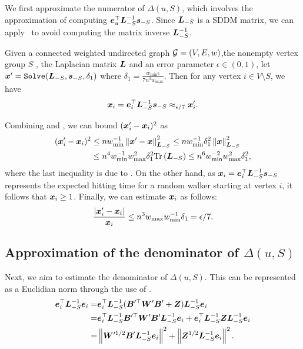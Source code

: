 \documentclass[10pt,journal,compsoc,twocolumn,twoside]{IEEEtran}
\begin{document}
We first approximate the numerator of \(\Delta(u,S)\), which involves the approximation of computing \(\boldsymbol{e}_u^\top\boldsymbol{L}_{-S}^{-1}\boldsymbol{s}_{-S}\).
Since \(\boldsymbol{L}_{-S}\) is a SDDM matrix, we can apply~ to avoid computing the matrix inverse \(\boldsymbol{L}_{-S}^{-1}\).
\begin{lemma}\label{lem:approx-numer}
    Given a connected weighted undirected graph \(\mathcal{G}=(V,E,w)\),the nonempty vertex group \(S\) , the Laplacian matrix \(\boldsymbol{L}\) and an error parameter \(\epsilon\in(0,1)\), let \(\boldsymbol{x}'=\mathtt{Solve}(\boldsymbol{L}_{-S},\boldsymbol{s}_{-S},\delta_1)\) where \(\delta_1=\frac{w_{\min}\epsilon}{7n^3w_{\max}}\). Then for any vertex \(i\in V\setminus S\), we have
    \begin{equation}\label{eq:approx-numer}
        \boldsymbol{x}_i=\boldsymbol{e}_i^\top\boldsymbol{L}_{-S}^{-1}\boldsymbol{s}_{-S}\approx_{\epsilon/7}\boldsymbol{x}'_i.
    \end{equation}
\end{lemma}
\begin{IEEEproof}

    Combining  and , we can bound \((\boldsymbol{x}'_i-\boldsymbol{x}_i)^2\) as
    \begin{align*}
        (\boldsymbol{x}'_i-\boldsymbol{x}_i)^2
         & \le nw_{\min}^{-1}\left\Vert\boldsymbol{x}'-\boldsymbol{x}\right\Vert^2_{\boldsymbol{L}_{-S}}
        \le nw_{\min}^{-1}\delta_1^2\left\Vert\boldsymbol{x}\right\Vert^2_{\boldsymbol{L}_{-S}}        \\
         & \le n^4w_{\min}^{-1}w_{\max}^2\delta_1^2\mathrm{Tr}\left(\boldsymbol{L}_{-S}\right)
        \le n^6w_{\min}^{-2}w_{\max}^2\delta_1^2,
    \end{align*}
    where the last inequality is due to .
    On the other hand, as \(\boldsymbol{x}_i=\boldsymbol{e}_i^\top\boldsymbol{L}_{-S}^{-1}\boldsymbol{s}_{-S}\) represents the expected hitting time for a random walker starting at vertex \(i\), it follows that \(\boldsymbol{x}_i\ge1\).
    Finally, we can estimate \(\boldsymbol{x}_i\) as follows:
    \begin{equation*}
        \frac{\left|\boldsymbol{x}'_i-\boldsymbol{x}_i \right|}{\boldsymbol{x}_i}\le n^3w_{\max}w_{\min}^{-1}\delta_1=\epsilon/7.
    \end{equation*}
\end{IEEEproof}

\subsection{Approximation of the denominator of \(\Delta(u,S)\)}

Next, we aim to estimate the denominator of \(\Delta(u,S)\). This can be represented as a Euclidian norm through the use of .
\begin{equation}\label{eq:denom-solver}
    \begin{split}
        \boldsymbol{e}_i^\top\boldsymbol{L}_{-S}^{-1}\boldsymbol{e}_i
        =&\boldsymbol{e}_i^\top\boldsymbol{L}_{-S}^{-1}(\boldsymbol{B}'^\top\boldsymbol{W}'\boldsymbol{B}'+\boldsymbol{Z})\boldsymbol{L}_{-S}^{-1}\boldsymbol{e}_i\\
        =&\boldsymbol{e}_i^\top\boldsymbol{L}_{-S}^{-1}\boldsymbol{B}'^\top\boldsymbol{W}'\boldsymbol{B}'\boldsymbol{L}_{-S}^{-1}\boldsymbol{e}_i+\boldsymbol{e}_i^\top\boldsymbol{L}_{-S}^{-1}\boldsymbol{Z}\boldsymbol{L}_{-S}^{-1}\boldsymbol{e}_i\\
        =&\left\Vert\boldsymbol{W}'^{1/2}\boldsymbol{B}'\boldsymbol{L}_{-S}^{-1}\boldsymbol{e}_i\right\Vert^2+\left\Vert\boldsymbol{Z}^{1/2}\boldsymbol{L}_{-S}^{-1}\boldsymbol{e}_i\right\Vert^2.
    \end{split}
\end{equation}
\end{document}
